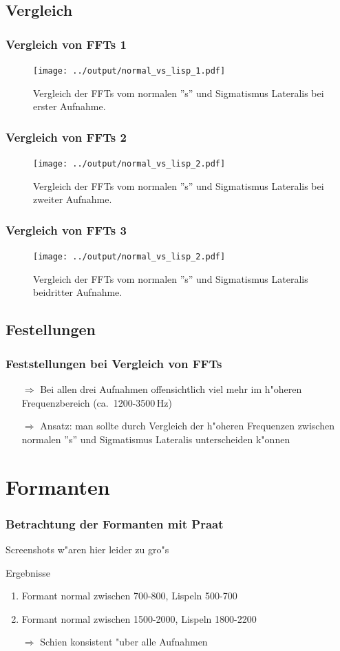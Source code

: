 \documentclass[11pt]{beamer}
\begin{document}
\subsection{Vergleich}

\begin{frame}
\frametitle{Vergleich von FFTs 1}
\begin{figure}
\texttt{[image: ../output/normal\_vs\_lisp\_1.pdf]}
\caption{Vergleich der FFTs vom normalen ''s'' und Sigmatismus Lateralis bei erster Aufnahme.}
\end{figure}
\end{frame}

\begin{frame}
\frametitle{Vergleich von FFTs 2}
\begin{figure}
\texttt{[image: ../output/normal\_vs\_lisp\_2.pdf]}
\caption{Vergleich der FFTs vom normalen ''s'' und Sigmatismus Lateralis bei zweiter Aufnahme.}
\end{figure}
\end{frame}

\begin{frame}
\frametitle{Vergleich von FFTs 3}
\begin{figure}
\texttt{[image: ../output/normal\_vs\_lisp\_2.pdf]}
\caption{Vergleich der FFTs vom normalen ''s'' und Sigmatismus Lateralis beidritter Aufnahme.}
\end{figure}
\end{frame}

\subsection{Festellungen}

\begin{frame}
\frametitle{Feststellungen bei Vergleich von FFTs}
\begin{itemize}
\item[$\Rightarrow$] Bei allen drei Aufnahmen offensichtlich viel mehr im h"oheren Frequenzbereich (ca.\ 1200-3500\,Hz)
\item[$\Rightarrow$] Ansatz: man sollte durch Vergleich der h"oheren Frequenzen zwischen normalen ''s'' und Sigmatismus Lateralis unterscheiden k"onnen
\end{itemize}
\end{frame}

\section{Formanten}

\begin{frame}
\frametitle{Betrachtung der Formanten mit Praat}
Screenshots w"aren hier leider zu gro"s
\begin{block}{Ergebnisse}
\begin{enumerate}
\item Formant normal zwischen 700-800, Lispeln 500-700
\item Formant normal zwischen 1500-2000, Lispeln 1800-2200
\item[$\Rightarrow$] Schien konsistent "uber alle Aufnahmen
\end{enumerate}
\end{block}
\end{frame}
\end{document}
